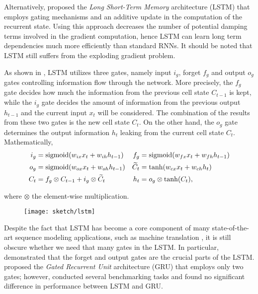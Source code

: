 Alternatively, \citet{HochreiterLongshorttermmemory1997} proposed the \textit{Long Short-Term Memory} architecture (LSTM) that employs gating mechanisms and an additive update in the computation of the recurrent state. Using this approach  decreases the number of potential damping terms involved in the gradient computation, hence LSTM can learn long term dependencies much more efficiently than standard RNNs. It should be noted that LSTM still suffers from the exploding gradient problem.

As shown in \addfigure{\ref{fig:lstm_structure}}, LSTM utilizes three gates, namely input $i_g$, forget $f_g$ and output $o_g$ gates controlling information flow through the network. More precisely, the $f_g$ gate decides how much the information from the previous cell state $C_{t-1}$ is kept, while the $i_g$ gate decides the amount of information from the previous output $h_{t-1}$ and the current input $x_t$ will be considered.  The combination of the results from these two gates is the new cell state $C_{t}$. On the other hand, the $o_g$ gate determines the output information $h_t$ leaking from the current cell state $C_t$. Mathematically, 
\begin{align*}
	i_g &= \text{sigmoid}( w_{ix} x_t + w_{ih} h_{t-1} )  &  	f_g &= \text{sigmoid}( w_{fx} x_t + w_{fh} h_{t-1} )\\
	o_g &= \text{sigmoid}( w_{ox} x_t + w_{oh} h_{t-1} ) & \widetilde{C}_t &= \tanh(w_{cx} x_t + w_{ch} h_t) \\
	C_t &= f_g \otimes C_{t-1} + i_g  \otimes  \widetilde{C}_t & h_{t} &= o_g \otimes \tanh(C_t),
\end{align*}

where $\otimes$ the element-wise multiplication.


\begin{figure}
\centering
\texttt{[image: sketch/lstm]}

\label{fig:lstm_structure} 
\end{figure}

Despite the fact that  LSTM has become a core component of many state-of-the-art sequence modeling applications, such as machine translation \citep{MelisStateArtEvaluation2018}, it is still obscure whether we need that many gates in the LSTM. In particular, \citet{GreffLSTMsearchspace2017} demonstrated that the forget and output gates are the crucial parts of the LSTM.  \citet{ChoLearningPhraseRepresentations2014a} proposed the \textit{Gated Recurrent Unit} architecture (GRU) that employs only two	 gates; however, \citet{JozefowiczEmpiricalExplorationRecurrent2015} conducted several benchmarking tasks and found no significant difference in performance between LSTM and GRU. 

